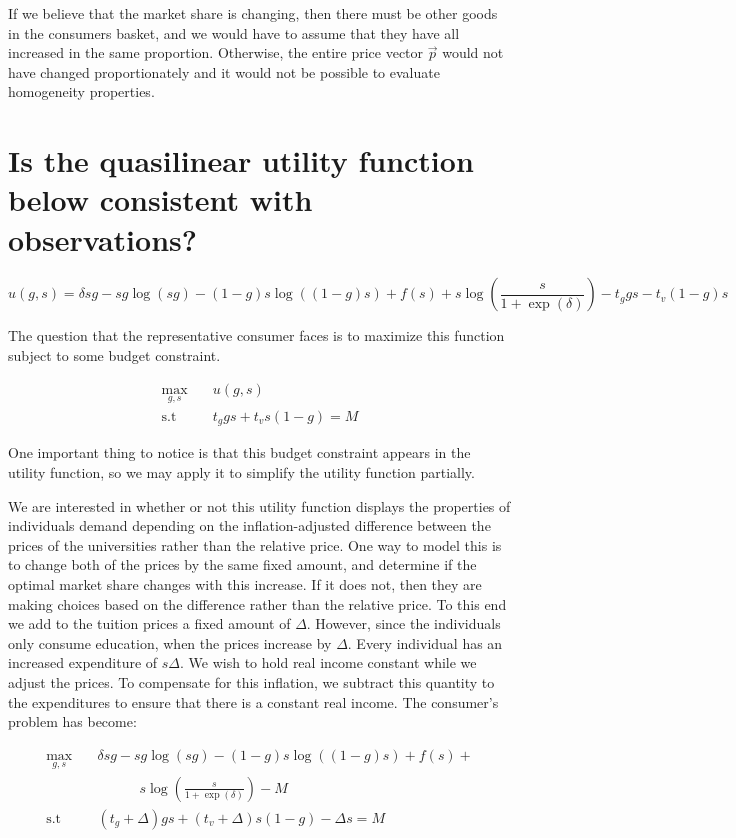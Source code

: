 \documentclass[12pt]{paper}
\begin{document}
If we believe that the market share is changing, then there must be
other goods in the consumers basket, and we would have to assume that
they have all increased in the same proportion. Otherwise, the entire
price vector $\vec{p}$ would not have changed proportionately and it
would not be possible to evaluate homogeneity properties.

\section{Is the quasilinear utility function below consistent with
  observations?}

\begin{equation*}
  u(g,s) = \delta s g - s g \log ( s g ) - (1-g)s \log( (1-g) s) + f(s) + s
  \log \left( \frac{s}{1 + \exp(\delta)} \right) - t_g g s - t_v (1-g)s
\end{equation*}

The question that the representative consumer faces is to maximize
this function subject to some budget constraint.

\begin{align*}
  \max_{g,s} \quad &u(g,s)\\
  \text{s.t}\quad & t_g g s + t_v s( 1- g) = M
\end{align*}

One important thing to notice is that this budget constraint appears
in the utility function, so we may apply it to simplify the utility
function partially.

We are interested in whether or not this utility function displays the
properties of individuals demand depending on the inflation-adjusted
difference between the prices of the universities rather than the
relative price. One way to model this is to change both of the prices
by the same fixed amount, and determine if the optimal market share
changes with this increase. If it does not, then they are making
choices based on the difference rather than the relative price. To
this end we add to the tuition prices a fixed amount of $\Delta$. However,
since the individuals only consume education, when the prices increase
by $\Delta$. Every individual has an increased expenditure of
$s \Delta$. We wish to hold real income constant while we adjust the
prices. To compensate for this inflation, we subtract this quantity to
the expenditures to ensure that there is a constant real income. The
consumer's problem has become:

\begin{align*}
  \max_{g,s} \quad &\delta s g - s g \log ( s g ) - (1-g)s \log( (1-g) s) +
                 f(s) + \\
  &\quad\quad\quad s \log \left( \frac{s}{1 + \exp(\delta)} \right) - M\\
  \text{s.t}\quad & (t_g+\Delta) g s + (t_v + \Delta) s( 1- g) - \Delta s = M
\end{align*}
\end{document}
